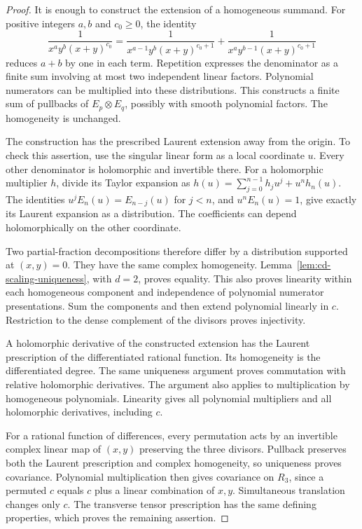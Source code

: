 \begin{proof}
It is enough to construct the extension of a homogeneous summand.
For positive integers $a,b$ and $c_0\ge0$, the identity
\[
 \frac1{x^ay^b(x+y)^{c_0}}
 =\frac1{x^{a-1}y^b(x+y)^{c_0+1}}
  +\frac1{x^ay^{b-1}(x+y)^{c_0+1}}
\]
reduces $a+b$ by one in each term.  Repetition expresses the denominator
as a finite sum involving at most two independent linear factors.
Polynomial numerators can be multiplied into these distributions.
This constructs a finite sum of pullbacks of $E_p\otimes E_q$,
possibly with smooth polynomial factors.  The homogeneity is unchanged.

The construction has the prescribed Laurent extension away from the
origin.  To check this assertion, use the singular linear form as a local
coordinate $u$.  Every other denominator is holomorphic and invertible
there.  For a holomorphic multiplier $h$, divide its Taylor expansion as
$h(u)=\sum_{j=0}^{n-1}h_j u^j+u^n h_n(u)$.
The identities $u^jE_n(u)=E_{n-j}(u)$ for $j<n$, and
$u^nE_n(u)=1$, give exactly its Laurent expansion as a distribution.
The coefficients can depend holomorphically on the other coordinate.

Two partial-fraction decompositions therefore differ by a distribution
supported at $(x,y)=0$.  They have the same complex homogeneity.
Lemma~\ref{lem:cd-scaling-uniqueness}, with $d=2$, proves equality.
This also proves linearity within each homogeneous component and independence
of polynomial numerator presentations.  Sum the components and then extend
polynomial linearly in $c$.  Restriction to the dense complement of the
divisors proves injectivity.

A holomorphic derivative of the constructed extension has the Laurent
prescription of the differentiated rational function.  Its homogeneity
is the differentiated degree.  The same uniqueness argument proves
commutation with relative holomorphic derivatives.  The argument also
applies to multiplication by homogeneous polynomials.  Linearity gives
all polynomial multipliers and all holomorphic derivatives, including $c$.

For a rational function of differences, every permutation acts by an
invertible complex linear map of $(x,y)$ preserving the three divisors.
Pullback preserves both the Laurent prescription and complex homogeneity,
so uniqueness proves covariance.  Polynomial multiplication then gives
covariance on $R_3$, since a permuted $c$ equals $c$ plus a linear
combination of $x,y$.  Simultaneous translation changes only $c$.
The transverse tensor prescription has the same defining properties,
which proves the remaining assertion.
\end{proof}

